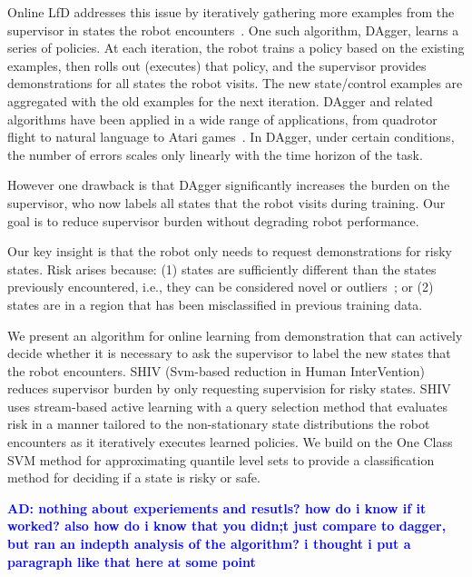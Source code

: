 \documentclass[10pt, conference]{ieeeconf}      %
\newcommand{\adnote}[1]{\ifthenelse{ \boolean{include-notes}}%
 {\textcolor{blue}{\textbf{AD: #1}}}{}}
\begin{document}
Online LfD addresses this issue by iteratively gathering more examples from the supervisor in states the robot encounters~\cite{grollman2007dogged,ross2010efficient,ross2010reduction}. One such algorithm, DAgger, learns a series of policies. At each iteration, the robot trains a policy based on the existing examples, then rolls out (executes) that policy, and the supervisor provides demonstrations for all states the robot visits. The new state/control examples are aggregated with the old examples for the next iteration. DAgger and related algorithms have been applied in a wide range of applications, from quadrotor flight to natural language to Atari games~\cite{NIPS2014_5421,duvallet2013imitation,ross2013learning}. In DAgger, under certain conditions, the number of errors scales only linearly with the time horizon of the task\cite{ross2010reduction}.

However one drawback is that DAgger significantly increases the burden on the supervisor, who now labels all states that the robot visits during training.  Our goal is to reduce supervisor burden without degrading robot performance.

Our key insight is that the robot only needs to request demonstrations for risky states. Risk arises because:  (1) states are sufficiently different than the states previously encountered, i.e., they can be considered novel or outliers~\cite{hodge2004survey}; or (2) states are in a region that has been misclassified in previous training data.


We present an algorithm for online learning from demonstration that can actively decide whether it is necessary to ask the supervisor to label the new states that the robot encounters. SHIV  (Svm-based reduction in Human InterVention) reduces supervisor burden by only requesting supervision for risky states. SHIV uses stream-based active learning with a query selection method that evaluates risk in a manner tailored to the non-stationary state distributions the robot encounters as it iteratively executes learned policies. We build on the One Class SVM method for approximating quantile level sets \cite{scholkopf2001estimating} to provide a classification method for deciding if a state is risky or safe.


\adnote{nothing about experiements and resutls? how do i know if it worked? also how do i know that you didn;t just compare to dagger, but ran an indepth analysis of the algorithm? i thought i put a paragraph like that here at some point}
\end{document}

